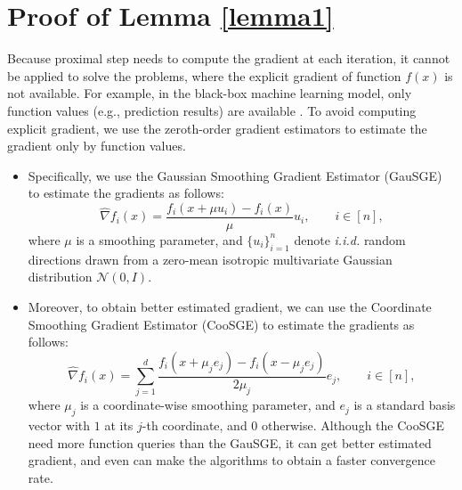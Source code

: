 \documentclass{article}
\theoremstyle{definition}
\theoremstyle{remark}
\begin{document}
\section{Proof of Lemma \ref{lemma1}}\label{append}
Because proximal step needs to compute
the gradient at each iteration, it cannot be applied to solve the problems, where the explicit gradient of function $f(x)$ is not available. For example, in the black-box machine learning model, only function values (e.g., prediction results) are available \cite{Chen etal.(2017)}. To avoid computing explicit gradient, we use the zeroth-order gradient estimators \cite{(Nes-
terov and Spokoiny, 2017; Liu et al., 2018c)} to estimate the gradient only by function values.
\begin{itemize}
\item Specifically, we use the Gaussian Smoothing Gradient Estimator (GauSGE) \cite{(Nesterov and Spokoiny, 2017; Ghadimi, Lan, and Zhang, 2016)} to estimate the gradients as follows:
\begin{equation}
\hat{\nabla} f_i(x) = \frac{f_i(x+\mu u_i)-f_i(x)}{\mu}u_i,\qquad i\in [n],
\end{equation}
where $\mu$ is a smoothing parameter, and $\{u_i\}_{i=1}^n$ denote {\it i.i.d.} random directions drawn from a zero-mean isotropic multivariate Gaussian distribution $\mathcal{N}(0,I)$.
\item Moreover, to obtain better estimated gradient, we can use the Coordinate Smoothing Gradient Estimator (CooSGE) \cite{(Gu, Huo, and Huang, 2016; Gu et al., 2018;
Liu et al., 2018c)} to estimate the gradients as follows:
\begin{equation}
\hat{\nabla} f_i(x) = \sum_{j=1}^d\frac{f_i(x+\mu_j e_j)-f_i(x-\mu_j e_j)}{2\mu_j}e_j,\qquad i\in [n],
\end{equation}
where $\mu_j$ is a coordinate-wise smoothing parameter, and $e_j$ is a standard basis vector with $1$ at its $j$-th coordinate, and $0$ otherwise. Although the CooSGE need more function queries than the GauSGE, it can get better estimated gradient, and even can make the algorithms to obtain a faster convergence rate.
\end{itemize}
\end{document}
